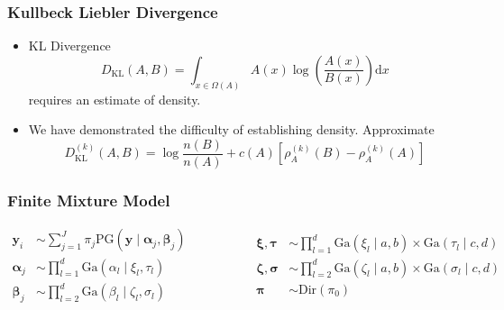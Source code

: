 \documentclass[aspectratio=169]{beamer}
\begin{document}
\begin{frame}
  \frametitle{Kullbeck Liebler Divergence}
  \begin{itemize}
    \item KL Divergence
      \begin{equation*}
        D_{\text{KL}}(A,B) = \int_{x\in \Omega(A)}A(x)\log\left(\frac{A(x)}{B(x)}\right)\text{d}x
      \end{equation*}
      requires an estimate of density.
    \pause
    \item We have demonstrated the difficulty of establishing density.  Approximate
      \begin{equation*}
      D_{\text{KL}}^{(k)}(A,B) = \log\frac{n(B)}{n(A)} + c(A) \left[\rho_A^{(k)}(B)
                                                      - \rho_A^{(k)}(A)\right]
      \end{equation*}
  \end{itemize}
\end{frame} %
\begin{frame}
  \frametitle{Finite Mixture Model}
  \begin{equation*}
    \begin{aligned}
      \bm{ y}_i &\sim \sum_{j = 1}^J\pi_j\text{PG}\left(\bm{ y}\mid \bm{ \alpha}_j, \bm{ \beta}_j\right)\\
      \bm{ \alpha}_j &\sim {\textstyle \prod}_{l = 1}^d \text{Ga}\left(\alpha_l\mid\xi_l,\tau_l\right)\\
      \bm{ \beta}_j &\sim {\textstyle \prod}_{l = 2}^d \text{Ga}\left(\beta_l\mid\zeta_l,\sigma_l\right)
    \end{aligned}
    \hspace{2cm}
    \begin{aligned}
      \bm{ \xi},\bm{\tau} &\sim {\textstyle \prod}_{l = 1}^d \text{Ga}(\xi_l\mid a,b)
                \times \text{Ga}(\tau_l\mid c,d)\\
      \bm{ \zeta},\bm{\sigma} &\sim {\textstyle\prod}_{l = 2}^d\text{Ga}(\zeta_l \mid a,b)
              \times \text{Ga}(\sigma_l\mid c,d)\\
      \bm{ \pi} &\sim \text{Dir}(\pi_0)
    \end{aligned}
  \end{equation*}
\end{frame} %
\end{document}
